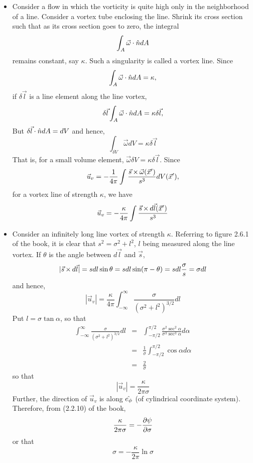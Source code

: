 \begin{itemize}
\item Consider a flow in which the vorticity is quite high only in the neighborhood of a line. Consider a vortex tube enclosing the line. Shrink its cross section such that as its cross 
section goes to zero, the integral
\[
\int_A \vec{\omega}\cdot\hat{n} dA 
\]
remains constant, say $\kappa$. Such a singularity is called a vortex line. Since
\[
\int_A \vec{\omega}\cdot\hat{n} dA = \kappa,
\]
if $\delta\vec{l}$ is a line element along the line vortex,
\[
\delta\vec{l}\int_A \vec{\omega}\cdot\hat{n} dA = \kappa\delta\vec{l},
\]
But $\delta\vec{l}\cdot\hat{n} dA = dV$ and hence,
\[
\int_{\delta V} \vec{\omega} dV = \kappa\delta\vec{l}
\]
That is, for a small volume element, $\vec{\omega}\delta V = \kappa\delta\vec{l}$. Since
\[
\vec{u}_v = -\frac{1}{4\pi}\int\frac{\vec{s} \operatorname{\times} \vec{\omega}(\vec{x}^\prime)}{s^3} dV(\vec{x}^\prime),
\]
for a vortex line of strength $\kappa$, we have
\begin{equation}\label{c2s6e1}
\vec{u}_v = -\frac{\kappa}{4\pi}\int \frac{\vec{s} \operatorname{\times} d\vec{l}(\vec{x}^\prime)}{s^3}
\end{equation}

\item Consider an infinitely long line vortex of strength $\kappa$. Referring to figure 2.6.1 of the book, it is clear that $s^2 = \sigma^2 + l^2$, $l$ being measured along the line
vortex. If $\theta$ is the angle between $d\vec{l}$ and $\vec{s}$,
\[
|\vec{s} \operatorname{\times} d\vec{l}| = sdl\sin\theta = sdl\sin(\pi - \theta) = sdl\frac{\sigma}{s} = \sigma dl
\]
and hence,
\[
|\vec{u}_v| = \frac{\kappa}{4\pi}\int_{-\infty}^\infty \frac{\sigma}{(\sigma^2 + l^2)^{3/2}} dl
\]
Put $l = \sigma\tan\alpha$, so that
\begin{eqnarray*}
\int_{-\infty}^\infty \frac{\sigma}{(\sigma^2 + l^2)^{3/2}} dl &=& \int_{-\pi/2}^{\pi/2} \frac{\sigma^2\sec^2\alpha}{\sigma^3\sec^3\alpha} d\alpha \\
 &=& \frac{1}{\sigma}\int_{-\pi/2}^{\pi/2}\cos\alpha d\alpha \\
 &=& \frac{2}{\sigma}
\end{eqnarray*}
so that
\[
|\vec{u}_v| = \frac{\kappa}{2\pi\sigma}
\]
Further, the direction of $\vec{u}_v$ is along $\hat{e_{\phi}}$ (of cylindrical coordinate system). Therefore, from (2.2.10) of the book,
\[
\frac{\kappa}{2\pi\sigma} = -\frac{\partial{\psi}}{\partial{\sigma}}
\]
or that
\[
\sigma = -\frac{\kappa}{2\pi}\ln\sigma
\]


\end{itemize}
